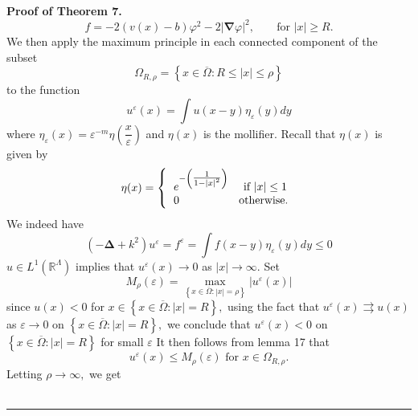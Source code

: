 \documentclass{article}
\newenvironment{proof}[1][Proof]{\noindent\textbf{#1.} }{\ \rule{0.5em}{0.5em}}
\begin{document}
\begin{proof}[Proof of Theorem 7]
\begin{equation}
f=-2\left( v(x)-b\right) \varphi ^{2}-2\left| \mathbf{\nabla }\varphi
\right| ^{2},\;\;\;\;\;\;\;\text{for }\left| x\right| \geq R.
\end{equation}%
We then apply the maximum principle in each connected component of the subset%
\begin{equation}
\Omega _{R,\rho }=\left\{ x\in \overline{\Omega }:R\leq \left| x\right| \leq
\rho \right\}
\end{equation}%
to the function 
\begin{equation}
u^{\varepsilon }(x)=\int u(x-y)\eta _{\varepsilon }(y)dy
\end{equation}%
where $\eta _{\varepsilon }(x)=\varepsilon ^{-m}\eta (\dfrac{x}{\varepsilon }%
)$ and $\eta (x)$ is the mollifier. Recall that $\eta (x)$ is given by 
\begin{equation*}
\eta (x)=\left\{ 
\begin{tabular}{l}
$e^{-\left( \tfrac{1}{1-\left| x\right| ^{2}}\right) }$ \ \ \ if $\left|
x\right| \leq 1$ \\ 
$0$ \ \ \ \ \ \ \ \ \ \ \ \ \ \ \ otherwise.%
\end{tabular}%
\right.
\end{equation*}%
We indeed have 
\begin{equation}
\left( -\mathbf{\Delta }+k^{2}\right) u^{\varepsilon }=f^{\varepsilon }=\int
f(x-y)\eta _{\varepsilon }(y)dy\leq 0
\end{equation}%
$u\in L^{1}(\mathbb{R}^{\Lambda })$ implies that $u^{\varepsilon
}(x)\rightarrow 0$ as $\left| x\right| \rightarrow \infty .$ Set 
\begin{equation}
M_{\rho }(\varepsilon )=\max\limits_{\left\{ x\in \overline{\Omega }:\left|
x\right| =\rho \right\} }\left| u^{\varepsilon }(x)\right|
\end{equation}%
since $u(x)<0$ for $x\in \left\{ x\in \overline{\Omega }:\left| x\right|
=R\right\} ,$ using the fact that $u^{\varepsilon }(x)\rightrightarrows u(x)$
as $\varepsilon \rightarrow 0$ on $\left\{ x\in \overline{\Omega }:\left|
x\right| =R\right\} ,$ we conclude that $u^{\varepsilon }(x)<0$ on $\left\{
x\in \overline{\Omega }:\left| x\right| =R\right\} $ for small $\varepsilon $%
It then follows from lemma 17 that 
\begin{equation}
u^{\varepsilon }(x)\leq M_{\rho }(\varepsilon )\text{ \ \ for }x\in \Omega
_{R,\rho }.
\end{equation}%
Letting $\rho \rightarrow \infty ,$ we get 
\begin{equation}

\end{equation}
\end{proof}
\end{document}
